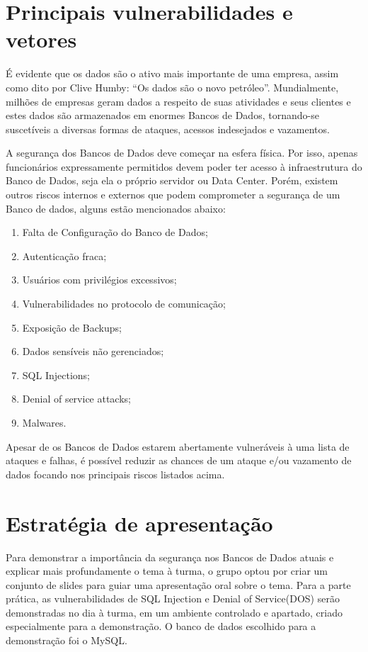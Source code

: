\vspace{1.0cm}
\begingroup
\let\clearpage\relax
\chapter{Principais vulnerabilidades e vetores}
\endgroup

É evidente que os dados são o ativo mais importante de uma empresa, assim como dito por Clive Humby: “Os dados são o novo petróleo”. Mundialmente, milhões de empresas geram dados a respeito de suas atividades e seus clientes e estes dados são armazenados em enormes Bancos de Dados, tornando-se suscetíveis a diversas formas de ataques, acessos indesejados e vazamentos.

A segurança dos Bancos de Dados deve começar na esfera física. Por isso, apenas funcionários expressamente permitidos devem poder ter acesso à infraestrutura do Banco de Dados, seja ela o próprio servidor ou Data Center. Porém, existem outros riscos internos e externos que podem comprometer a segurança de um Banco de dados, alguns estão mencionados abaixo:
\\
\begin{enumerate}
  \item Falta de Configuração do Banco de Dados;
  \item Autenticação fraca;
  \item Usuários com privilégios excessivos;
  \item Vulnerabilidades no protocolo de comunicação;
  \item Exposição de Backups;
  \item Dados sensíveis não gerenciados;
  \item SQL Injections;
  \item Denial of service attacks;
  \item Malwares.
\end{enumerate}

Apesar de os Bancos de Dados estarem abertamente vulneráveis à uma lista de ataques e falhas, é possível reduzir as chances de um ataque e/ou vazamento de dados focando nos principais riscos listados acima.

\vspace{1.0cm}
\begingroup
\let\clearpage\relax
\chapter{Estratégia de apresentação}
\endgroup

Para demonstrar a importância da segurança nos Bancos de Dados atuais e explicar mais profundamente o tema à turma, o grupo optou por criar um conjunto de slides para guiar uma apresentação oral sobre o tema. Para a parte prática, as vulnerabilidades de SQL Injection e Denial of Service(DOS) serão demonstradas no dia à turma, em um ambiente controlado e apartado, criado especialmente para a demonstração. O banco de dados escolhido para a demonstração foi o MySQL.


